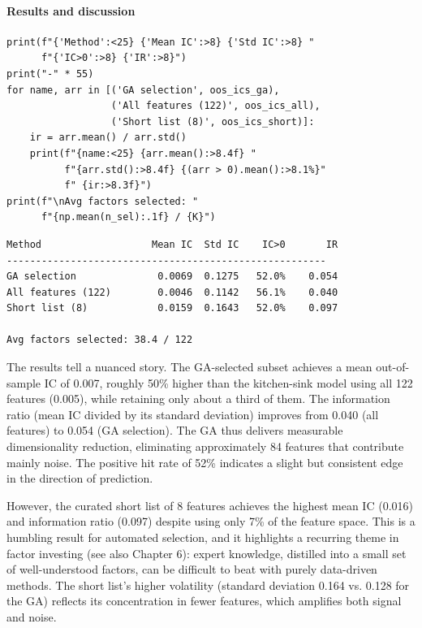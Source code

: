 \paragraph{Results and discussion}

\begin{verbatim}
print(f"{'Method':<25} {'Mean IC':>8} {'Std IC':>8} "
      f"{'IC>0':>8} {'IR':>8}")
print("-" * 55)
for name, arr in [('GA selection', oos_ics_ga),
                  ('All features (122)', oos_ics_all),
                  ('Short list (8)', oos_ics_short)]:
    ir = arr.mean() / arr.std()
    print(f"{name:<25} {arr.mean():>8.4f} "
          f"{arr.std():>8.4f} {(arr > 0).mean():>8.1%}"
          f" {ir:>8.3f}")
print(f"\nAvg factors selected: "
      f"{np.mean(n_sel):.1f} / {K}")
\end{verbatim}

\begin{verbatim}
Method                   Mean IC  Std IC    IC>0       IR
-------------------------------------------------------
GA selection              0.0069  0.1275   52.0%    0.054
All features (122)        0.0046  0.1142   56.1%    0.040
Short list (8)            0.0159  0.1643   52.0%    0.097

Avg factors selected: 38.4 / 122
\end{verbatim}

The results tell a nuanced story. The GA-selected subset achieves a mean out-of-sample IC of 0.007, roughly 50\% higher than the kitchen-sink model using all 122 features (0.005), while retaining only about a third of them. The information ratio (mean IC divided by its standard deviation) improves from 0.040 (all features) to 0.054 (GA selection). The GA thus delivers measurable dimensionality reduction, eliminating approximately 84 features that contribute mainly noise. The positive hit rate of 52\% indicates a slight but consistent edge in the direction of prediction.

However, the curated short list of 8 features achieves the highest mean IC (0.016) and information ratio (0.097) despite using only 7\% of the feature space. This is a humbling result for automated selection, and it highlights a recurring theme in factor investing (see also Chapter 6): expert knowledge, distilled into a small set of well-understood factors, can be difficult to beat with purely data-driven methods. The short list's higher volatility (standard deviation 0.164 vs. 0.128 for the GA) reflects its concentration in fewer features, which amplifies both signal and noise.

